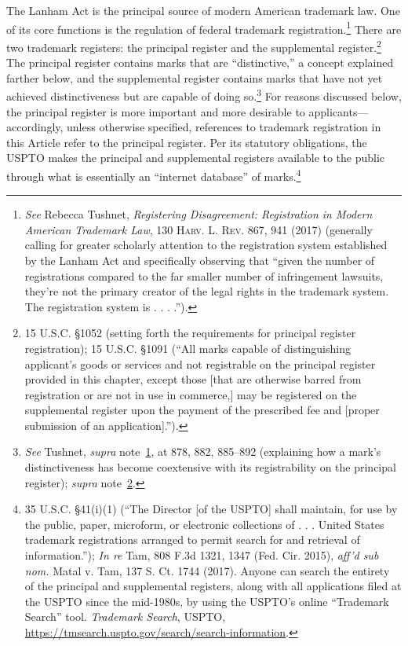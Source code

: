\documentclass[letterpaper, 11pt, oneside]{article}
\begin{document}
The Lanham Act is the principal source of modern American trademark law. One of its core functions is the regulation of federal trademark registration.\footnote{\label{supra6} \textit{See} Rebecca Tushnet, \textit{Registering Disagreement: Registration in Modern American Trademark Law}, 130 \textsc{Harv. L. Rev.} 867, 941 (2017) (generally calling for greater scholarly attention to the registration system established by the Lanham Act and specifically observing that ``given the number of registrations compared to the far smaller number of infringement lawsuits, they’re not the primary creator of the legal rights in the trademark system. The registration system is . . . .'').} There are two trademark registers: the principal register and the supplemental register.\footnote{\label{supra7} 15 U.S.C. \S 1052 (setting forth the requirements for principal register registration); 15 U.S.C. \S 1091 (``All marks capable of distinguishing applicant’s goods or services and not registrable on the principal register provided in this chapter, except those [that are otherwise barred from registration or are not in use in commerce,] may be registered on the supplemental register upon the payment of the prescribed fee and [proper submission of an application].'').} The principal register contains marks that are ``distinctive,'' a concept explained farther below, and the supplemental register contains marks that have not yet achieved distinctiveness but are capable of doing so.\footnote{\label{supra8} \textit{See} Tushnet, \textit{supra} note~\ref{supra6}, at 878, 882, 885–892 (explaining how a mark's distinctiveness has become coextensive with its registrability on the principal register); \textit{supra} note~\ref{supra7}.} For reasons discussed below, the principal register is more important and more desirable to applicants—accordingly, unless otherwise specified, references to trademark registration in this Article refer to the principal register. Per its statutory obligations, the USPTO makes the principal and supplemental registers available to the public through what is essentially an ``internet database'' of marks.\footnote{35 U.S.C. \S 41(i)(1) (``The Director [of the USPTO] shall maintain, for use by the public, paper, microform, or electronic collections of . . . United States trademark registrations arranged to permit search for and retrieval of information.''); \textit{In re} Tam, 808 F.3d 1321, 1347 (Fed. Cir. 2015), \textit{aff'd sub nom.} Matal v. Tam, 137 S. Ct. 1744 (2017). Anyone can search the entirety of the principal and supplemental registers, along with all applications filed at the USPTO since the mid-1980s, by using the USPTO's online ``Trademark Search'' tool. \textit{Trademark Search}, USPTO, \url{https://tmsearch.uspto.gov/search/search-information}.}
\end{document}
